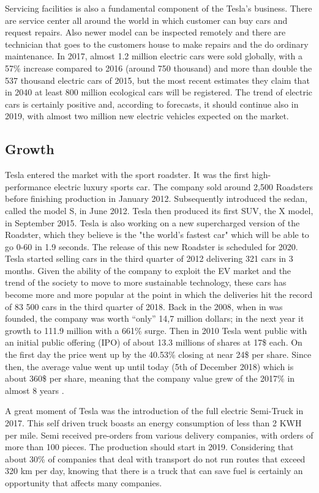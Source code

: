 Servicing facilities is also a fundamental component of the Tesla’s business. There are service center all around the world in which customer can buy cars and request repairs. Also newer model can be inspected remotely and there are technician that goes to the customers house to make repairs and the do ordinary maintenance.
In 2017, almost 1.2 million electric cars were sold globally, with a 57\% increase compared to 2016 (around 750 thousand) and more than double the 537 thousand electric cars of 2015, but the most recent estimates they claim that in 2040 at least 800 million ecological cars will be registered. The trend of electric cars is certainly positive and, according to forecasts, it should continue also in 2019, with almost two million new electric vehicles expected on the market.



\subsection{Growth}
Tesla entered the market with the sport roadster. It was the first high-performance electric luxury sports car. The company sold around 2,500 Roadsters before finishing production in January 2012.
Subsequently introduced the sedan, called the model S, in June 2012. Tesla then produced its first SUV, the X model, in September 2015. Tesla is also working on a new supercharged version of the Roadster, which they believe is the "the world's fastest car" which will be able to go 0-60 in 1.9 seconds. The release of this new Roadster is scheduled for 2020.
Tesla started selling cars in the third quarter of 2012 delivering 321 cars in 3 months. Given the ability of the company to exploit the EV market and the trend of the society to move to more sustainable technology, these cars has become more and more popular at the point in which the deliveries hit the record of 83 500 cars in the third quarter of 2018.
Back in the 2008, when in was founded, the company was worth “only” 14,7 million dollars; in the next year it growth to 111.9 million with a 661\% surge. Then in 2010 Tesla went public with an initial public offering (IPO) of about 13.3 millions of shares at 17\$ each. On the first day the price went up by the 40.53\% closing at near 24\$ per share. Since then, the average value went up until today (5th of December 2018) which is about 360\$ per share, meaning that the company value grew of the 2017\% in almost 8 years \cite{Growth}.

A great moment of Tesla was the introduction of the full electric Semi-Truck in 2017. This self driven truck boasts an energy consumption of less than 2 KWH per mile. Semi received pre-orders from various delivery companies, with orders of more than 100 pieces. The production should start in 2019. Considering that about 30\% of companies that deal with transport do not run routes that exceed 320 km per day, knowing that there is a truck that can save fuel is certainly an opportunity that affects many companies.

